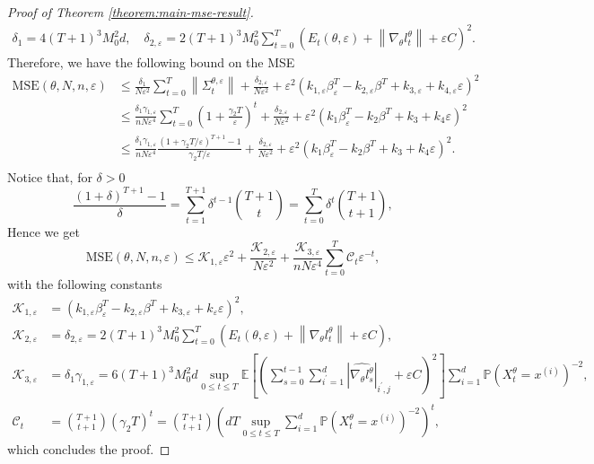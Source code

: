 \documentclass[11pt]{article}
\numberwithin{equation}{section}
\theoremstyle{definition}
\theoremstyle{remark}
\def\eps{\varepsilon}
\begin{document}
\begin{proof}[Proof of Theorem \ref{theorem:main-mse-result}]
\[\begin{aligned}
\delta_1 = 4 (T + 1)^3 M_0^2 d, \quad \delta_{2, \eps} = 2 (T + 1)^3 M_0^2 \sum_{t = 0}^T \left(E_t(\theta, \eps) + \left\| \nabla_\theta l_t^\theta \right\| +  \eps C\right)^2.
\end{aligned}
\]
 Therefore, we have the following bound on the MSE
\[
\begin{aligned}
    \mathrm{MSE}(\theta, N, n, \eps) &\leq   \frac{\delta_1}{N \eps^2} \sum_{t=0}^{T}  \left\| \Sigma_t^{\theta, \eps} \right\| + \frac{\delta_{2, \eps}}{N \eps^2} + \eps^{2}\left( k_{1, \eps} \beta_\eps^T - k_{2, \eps} \beta^T + k_{3, \eps} + k_{4, \eps} \eps \right)^2 \\
    & \leq \frac{\delta_1 \gamma_{1, \eps}}{nN \eps^4} \sum_{t=0}^T  \left(1 + \frac{\gamma_{2} T}{\eps}\right)^t + \frac{\delta_{2, \eps}}{N \eps^2} + \eps^2 \left( k_{1} \beta_\eps^T - k_{2} \beta^T + k_3 + k_4 \eps \right)^2 \\
    & \leq \frac{\delta_1 \gamma_{1, \eps}}{nN \eps^4} \frac{\left(1 + \gamma_2 T / \eps\right)^{T+1} - 1}{\gamma_2 T / \eps}  + \frac{\delta_{2, \eps}}{N \eps^2} + \eps^2\left( k_{1}  \beta_\eps^T - k_{2} \beta^T + k_3 + k_4 \eps \right)^2. \\ 
\end{aligned}
\]
Notice that, for $\delta > 0$
\[
\frac{(1 + \delta)^{T + 1} - 1}{\delta} = \sum_{t=1}^{T+1} \delta^{t-1} \binom{T+1}{t} = \sum_{t=0}^T \delta^t \binom{T + 1}{t + 1},
\]
Hence we get 
\[
\mathrm{MSE}(\theta, N, n, \eps) \leq \mathcal K_{1, \eps} \eps^2 + \frac{\mathcal K_{2, \eps}}{ N \eps^2} + \frac{\mathcal K_{3, \eps}}{n N \eps^4}  \sum_{t = 0}^T  \mathcal{C}_t\eps^{-t},
\]
with the following constants
\[
\begin{aligned}
  \mathcal K_{1, \eps} &= \left( k_{1,\eps}  \beta_\eps^T - k_{2,\eps} \beta^T + k_{3,\eps} + k_{\eps} \eps \right)^2, \\ 
  \mathcal K_{2, \eps} &= \delta_{2, \eps} =  2 (T + 1)^3 M_0^2 \sum_{t = 0}^T \left(E_t(\theta, \eps) + \left\| \nabla_\theta l_t^\theta \right\| +  \eps C\right),\\
  \mathcal K_{3,\eps} & = \delta_1 \gamma_{1, \eps} = 6 (T + 1)^3 M_0^2 d  \sup_{0 \leq t \leq T} \mathbb E \left[ \left(\sum_{s = 0}^{t-1} \sum_{i^\prime = 1}^d  \left|\widehat{\nabla_\theta l_s^\theta}\right|_{i^\prime,j}  + \eps C\right)^2 \right] \sum_{i=1}^d \mathbb P \left( X_t^\theta = x^{(i)} \right)^{-2}, \\
  \mathcal C_t &= \binom{T + 1}{t + 1}\left( \gamma_2 T \right)^t = \binom{T + 1}{t + 1}\left(   d T \sup_{0 \leq t \leq T} \sum_{i=1}^d \mathbb P \left( X_t^\theta = x^{(i)} \right)^{-2} \right)^t,
\end{aligned}
\]
which concludes the proof.
\end{proof}


\begin{small} 




\end{small} 
\end{document}
